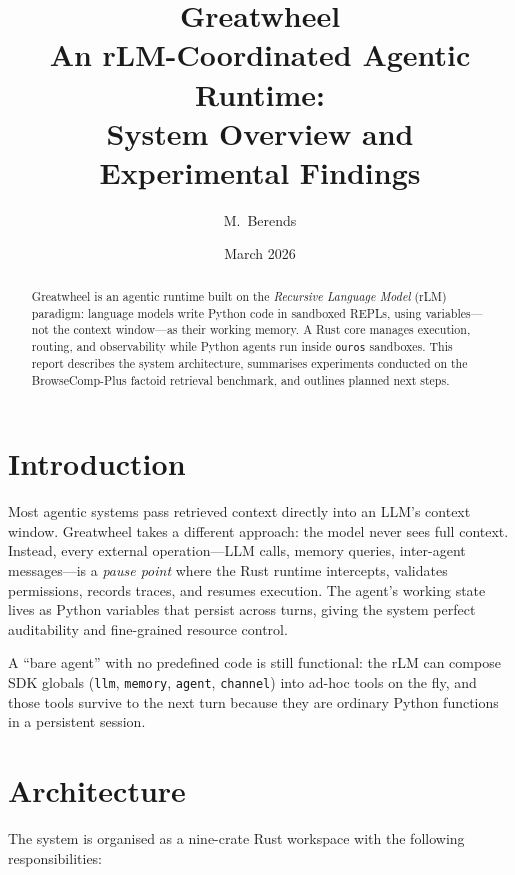 \documentclass[11pt,a4paper]{article}
\title{\textbf{Greatwheel}\\[0.3em]
  \large An rLM-Coordinated Agentic Runtime:\\
  System Overview and Experimental Findings}
\author{M.\ Berends}
\date{March 2026}
\begin{document}
\maketitle

\begin{abstract}
Greatwheel is an agentic runtime built on the \emph{Recursive Language Model}
(rLM) paradigm: language models write Python code in sandboxed REPLs, using
variables---not the context window---as their working memory. A Rust core
manages execution, routing, and observability while Python agents run inside
\texttt{ouros} sandboxes. This report describes the system architecture,
summarises experiments conducted on the BrowseComp-Plus factoid retrieval
benchmark, and outlines planned next steps.
\end{abstract}

\section{Introduction}

Most agentic systems pass retrieved context directly into an LLM's context
window. Greatwheel takes a different approach: the model never sees full
context. Instead, every external operation---LLM calls, memory queries,
inter-agent messages---is a \emph{pause point} where the Rust runtime
intercepts, validates permissions, records traces, and resumes execution. The
agent's working state lives as Python variables that persist across turns,
giving the system perfect auditability and fine-grained resource control.

A ``bare agent'' with no predefined code is still functional: the rLM can
compose SDK globals (\texttt{llm}, \texttt{memory}, \texttt{agent},
\texttt{channel}) into ad-hoc tools on the fly, and those tools survive to the
next turn because they are ordinary Python functions in a persistent session.

\section{Architecture}

The system is organised as a nine-crate Rust workspace with the following
responsibilities:
\end{document}
